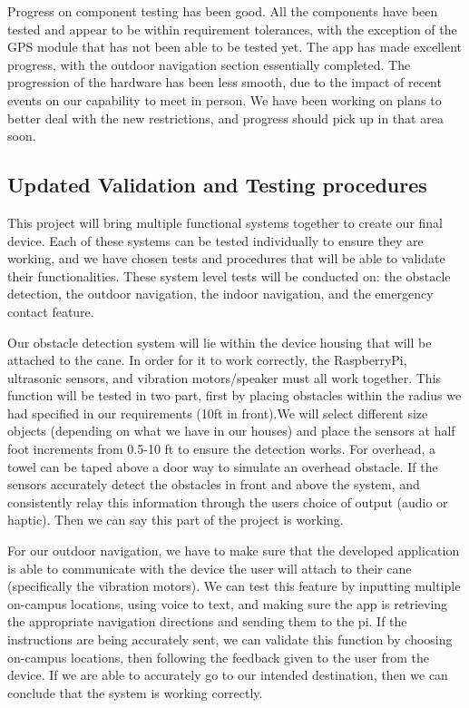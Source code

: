 \documentclass[letterpaper,12pt]{article}
\begin{document}
Progress on component testing has been good. All the components have been tested and appear to be within requirement tolerances, with the exception of the GPS module that has not been able to be tested yet. The app has made excellent progress, with the outdoor navigation section essentially completed. The progression of the hardware has been less smooth, due to the impact of recent events on our capability to meet in person. We have been working on plans to better deal with the new restrictions, and progress should pick up in that area soon.

\subsection{Updated Validation and Testing procedures}
This project will bring multiple functional systems together to create our final device. Each of these systems can be tested individually to ensure they are working, and we have chosen tests and procedures that will be able to validate their functionalities. These system level tests will be conducted on: the obstacle detection, the outdoor navigation, the indoor navigation, and the emergency contact feature. \par

Our obstacle detection system will lie within the device housing that will be attached to the cane. In order for it to work correctly, the RaspberryPi, ultrasonic sensors, and vibration motors/speaker must all work together. This function will be tested in two part, first by placing obstacles within the radius we had specified in our requirements (10ft in front).We will select different size objects (depending on what we have in our houses) and place the sensors at half foot increments from 0.5-10 ft to ensure the detection works. For overhead, a towel can be taped above a door way to simulate an overhead obstacle. If the sensors accurately detect the obstacles in  front and above the system, and consistently relay this information through the users choice of output (audio or haptic). Then we can say this part of the project is working.\par

For our outdoor navigation, we have to make sure that the developed application is able to communicate with the device the user will attach to their cane (specifically the vibration motors). We can test this feature by inputting multiple on-campus locations, using voice to text, and making sure the app is retrieving the appropriate navigation directions and sending them to the pi. If the instructions are being accurately sent, we can validate this function by
choosing on-campus locations, then following the feedback given to the user from the device. If we are able to accurately go to our intended destination, then we can conclude that the system is working correctly.\par
\end{document}
